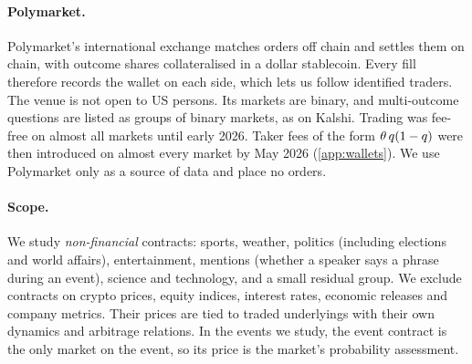 \paragraph{Polymarket.} Polymarket's international exchange matches orders off chain and settles
them on chain, with outcome shares collateralised in a dollar stablecoin. Every fill therefore
records the wallet on each side, which lets us follow identified traders. The venue is not open to
US persons. Its markets are binary, and multi-outcome questions are listed as groups of binary
markets, as on Kalshi. Trading was fee-free on almost all markets until early 2026. Taker fees of
the form $\theta\,q(1-q)$ were then introduced on almost every market by May 2026
(\cref{app:wallets}). We use Polymarket only as a source of data and place no orders.

\paragraph{Scope.} We study \emph{non-financial} contracts: sports, weather, politics (including
elections and world affairs), entertainment, mentions (whether a speaker says a phrase during an
event), science and technology, and a small residual group. We exclude contracts on crypto prices,
equity indices, interest rates, economic releases and company metrics. Their prices are tied to
traded underlyings with their own dynamics and arbitrage relations. In the events we study, the
event contract is the only market on the event, so its price is the market's probability
assessment.

